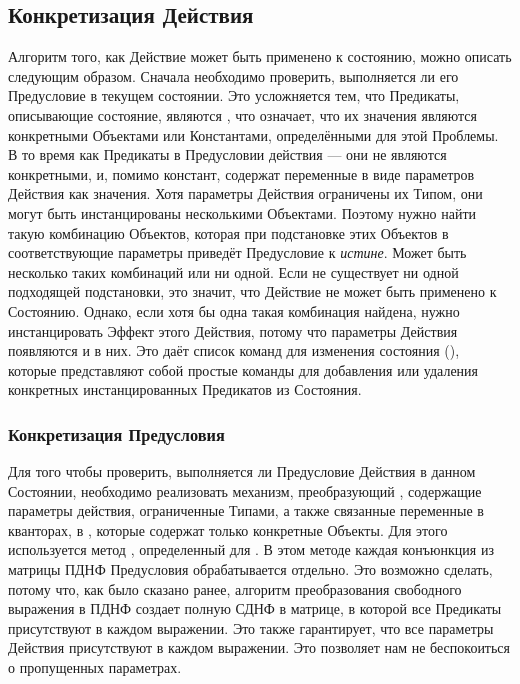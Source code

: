 \subsection{Конкретизация Действия}

Алгоритм того, как Действие может быть применено к состоянию, можно описать следующим образом.
Сначала необходимо проверить, выполняется ли его Предусловие в текущем состоянии.
Это усложняется тем, что Предикаты, описывающие состояние,
являются , что означает,
что их значения являются конкретными Объектами или Константами,
определёнными для этой Проблемы.
В то время как Предикаты в Предусловии действия 
--- они не являются конкретными, и, помимо констант, содержат переменные
в виде параметров Действия как значения.
Хотя параметры Действия ограничены их Типом, 
они могут быть инстанцированы несколькими Объектами.
Поэтому нужно найти такую комбинацию Объектов,
которая при подстановке этих Объектов в соответствующие параметры приведёт
Предусловие к \textit{истине}. Может быть несколько таких комбинаций или ни одной.
Если не существует ни одной подходящей подстановки,
это значит, что Действие не может быть применено к Состоянию.
Однако, если хотя бы одна такая комбинация найдена, нужно инстанцировать Эффект этого Действия,
потому что параметры Действия появляются и в них.
Это даёт список команд для изменения состояния (),
которые представляют собой простые команды для добавления или удаления
конкретных инстанцированных Предикатов из Состояния.

\subsubsection{Конкретизация Предусловия}

Для того чтобы проверить, выполняется ли Предусловие Действия в данном Состоянии,
необходимо реализовать механизм, преобразующий ,
содержащие параметры действия, ограниченные Типами,
а также связанные переменные в кванторах, в ,
которые содержат только конкретные Объекты.
Для этого используется метод , определенный для .
В этом методе каждая конъюнкция из матрицы ПДНФ Предусловия обрабатывается отдельно.
Это возможно сделать, потому что, как было сказано ранее,
алгоритм преобразования свободного выражения в ПДНФ создает полную СДНФ в матрице,
в которой все Предикаты присутствуют в каждом выражении.
Это также гарантирует, что все параметры Действия присутствуют в каждом выражении.
Это позволяет нам не беспокоиться о пропущенных параметрах.

